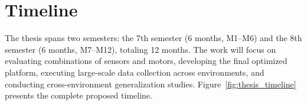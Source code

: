\documentclass[12pt,a4paper]{article}
\begin{document}

    \section{Timeline}

    The thesis spans two semesters: the 7th semester (6 months, M1--M6) and the 8th semester (6 months, M7--M12), totaling 12 months. The work will focus on evaluating combinations of sensors and motors, developing the final optimized platform, executing large-scale data collection across environments, and conducting cross-environment generalization studies. Figure~\ref{fig:thesis_timeline} presents the complete proposed timeline.
\end{document}
